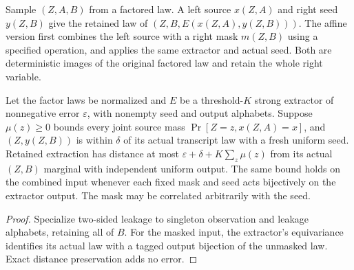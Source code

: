 \begin{definition}
  \label{def:lowerbounds-algebraic-affine-initialization}
  \leanok
  Sample $(Z,A,B)$ from a factored law. A left source $x(Z,A)$ and
  right seed $y(Z,B)$ give the retained law of
  $(Z,B,E(x(Z,A),y(Z,B)))$. The affine version first combines the
  left source with a right mask $m(Z,B)$ using a specified operation,
  and applies the same extractor and actual seed. Both are deterministic
  images of the original factored law and retain the whole right variable.
\end{definition}

\begin{theorem}
  \label{thm:lowerbounds-algebraic-affine-initialization}
  \leanok
  Let the factor laws be normalized and $E$ be a threshold-$K$ strong
  extractor of nonnegative error $\varepsilon$, with nonempty seed and
  output alphabets. Suppose $\mu(z)\ge0$ bounds every joint source mass
  $\Pr[Z=z,x(Z,A)=x]$, and $(Z,y(Z,B))$ is within $\delta$ of its
  actual transcript law with a fresh uniform seed. Retained extraction
  has distance at most $\varepsilon+\delta+K\sum_z\mu(z)$ from its
  actual $(Z,B)$ marginal with independent uniform output. The same bound
  holds on the combined input whenever each fixed mask and seed acts
  bijectively on the extractor output. The mask may be correlated
  arbitrarily with the seed.
\end{theorem}
\begin{proof}
  \leanok
  Specialize two-sided leakage to singleton observation and leakage
  alphabets, retaining all of $B$. For the masked input, the extractor's
  equivariance identifies its actual law with a tagged output bijection
  of the unmasked law. Exact distance preservation adds no error.
\end{proof}

